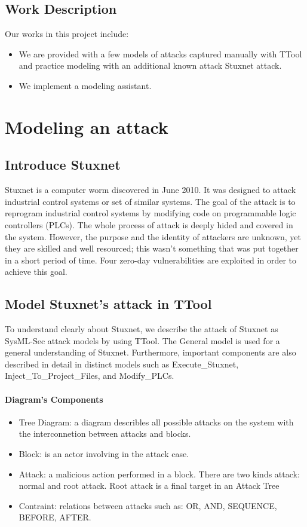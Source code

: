 \documentclass[a4paper,12pt,oneside]{report}
\newcommand{\mychapter}[2]{
    \setcounter{chapter}{#1}
    \setcounter{section}{0}
    \chapter*{#2}
    \addcontentsline{toc}{chapter}{#2}
}
\begin{document}
\section{Work Description}
Our works in this project include:
\begin{itemize}
\item We are provided with a few models of attacks captured manually with TTool and practice modeling with an additional known attack Stuxnet attack.
\item We implement a modeling assistant.
\end{itemize}

\mychapter{2}{Modeling an attack}
	\section{Introduce Stuxnet}
		
		Stuxnet\cite{stuxnet2} is a computer worm discovered in June 2010. It was designed to attack industrial control systems or set of similar systems. The goal of the attack is to reprogram industrial control systems by modifying code on programmable logic controllers (PLCs). The whole process of attack is deeply hided and covered in the system. However, the purpose and the identity of attackers are unknown, yet they are skilled and well resourced; this wasn't something that was put together in a short period of time. Four zero-day vulnerabilities are exploited in order to achieve this goal.
		
	\section{Model Stuxnet's attack in TTool}	
	To understand clearly about Stuxnet, we describe the attack of Stuxnet as SysML-Sec attack models by using TTool.
	The General model is used for a general understanding of Stuxnet. Furthermore, important components are also described in detail in distinct models such as Execute\_Stuxnet, Inject\_To\_Project\_Files, and Modify\_PLCs.
	\subsubsection{Diagram's Components}
	\begin{itemize}
		\item Tree Diagram: a diagram describles all possible attacks on
the system with the interconnetion between attacks and blocks. 
		\item Block: is an actor involving in the attack case.
		\item Attack: a malicious action performed in a block. There are two kinds attack: normal and root attack. Root attack is a final target in an Attack Tree 
		\item Contraint: relations between attacks such as:  OR, AND, SEQUENCE, BEFORE, AFTER.
	\end{itemize}
\end{document}
